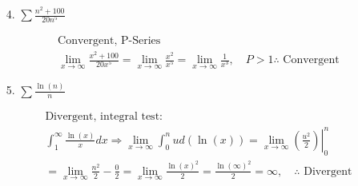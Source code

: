 \begin{itemize}
        \item [4.]
        $\sum\frac{n^{2}+100}{20n^{5}}$
        \\
        \begin{mdframed}
            \begin{equation*}
                \begin{gathered}
                    \boxed{\text{Convergent, P-Series}}                                \\
                      \lim_{x \to \infty}\frac{x^{2}+100}{20x^{5}}
                    = \lim_{x \to \infty}\frac{x^{2}}{x^{5}}
                    = \lim_{x \to \infty}\frac{1}{x^{3}}, \quad
                    P > 1 \therefore \text{ Convergent}
                \end{gathered}
            \end{equation*}
        \end{mdframed}
        
        \item [5.]
        $\sum\frac{\ln(n)}{n}$
        \\
        \begin{mdframed}
            \begin{equation*}
                \begin{gathered}
                    \boxed{\text{Divergent, integral test:}}                               \\
                      \int_{1}^{\infty}\frac{\ln(x)}{x}dx \Rightarrow 
                        \lim_{x \to \infty}\int_{0}^{n}ud(\ln(x))
                      = \lim_{x \to \infty}\left.\left(\frac{u^{2}}{2}\right)\right|_{0}^{n}\\
                      = \lim_{x \to \infty}\frac{n^{2}}{2}-\frac{0}{2}
                      = \lim_{x \to \infty}\frac{\ln(x)^{2}}{2}
                      = \frac{\ln(\infty)^{2}}{2} = \infty, \quad
                      \therefore \text{ Divergent}
                \end{gathered}
            \end{equation*}
        \end{mdframed}
    \end{itemize}

